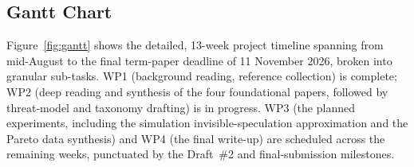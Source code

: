 \documentclass[11pt,a4paper]{article}
\begin{document}
\subsection{Gantt Chart}
\label{sec:gantt}

Figure~\ref{fig:gantt} shows the detailed, 13-week project timeline spanning from
mid-August to the final term-paper deadline of 11 November 2026, broken into
granular sub-tasks. WP1 (background reading, reference collection) is complete;
WP2 (deep reading and synthesis of the four foundational papers, followed by
threat-model and taxonomy drafting) is in progress. WP3 (the planned experiments, including the simulation invisible-speculation
approximation and the Pareto data synthesis) and WP4 (the final write-up) are
scheduled across the remaining weeks, punctuated by the Draft~\#2 and
final-submission milestones.
\end{document}
